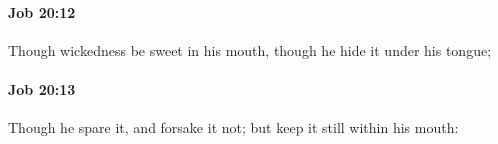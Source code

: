 		\paragraph{Job 20:12} %
			\label{JOB-20-12}

			Though wickedness be sweet in his mouth, though he hide it under his tongue;


		\paragraph{Job 20:13} %
			\label{JOB-20-13}

			Though he spare it, and forsake it not; but keep it still within his mouth:


